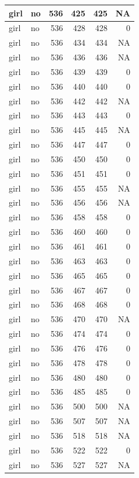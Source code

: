 \documentclass[man]{apa6}
\begin{document}
\begin{tabular}{l|l|r|r|r|r}
\hline
girl & no & 536 & 425 & 425 & NA\\
\hline
girl & no & 536 & 428 & 428 & 0\\
\hline
girl & no & 536 & 434 & 434 & NA\\
\hline
girl & no & 536 & 436 & 436 & NA\\
\hline
girl & no & 536 & 439 & 439 & 0\\
\hline
girl & no & 536 & 440 & 440 & 0\\
\hline
girl & no & 536 & 442 & 442 & NA\\
\hline
girl & no & 536 & 443 & 443 & 0\\
\hline
girl & no & 536 & 445 & 445 & NA\\
\hline
girl & no & 536 & 447 & 447 & 0\\
\hline
girl & no & 536 & 450 & 450 & 0\\
\hline
girl & no & 536 & 451 & 451 & 0\\
\hline
girl & no & 536 & 455 & 455 & NA\\
\hline
girl & no & 536 & 456 & 456 & NA\\
\hline
girl & no & 536 & 458 & 458 & 0\\
\hline
girl & no & 536 & 460 & 460 & 0\\
\hline
girl & no & 536 & 461 & 461 & 0\\
\hline
girl & no & 536 & 463 & 463 & 0\\
\hline
girl & no & 536 & 465 & 465 & 0\\
\hline
girl & no & 536 & 467 & 467 & 0\\
\hline
girl & no & 536 & 468 & 468 & 0\\
\hline
girl & no & 536 & 470 & 470 & NA\\
\hline
girl & no & 536 & 474 & 474 & 0\\
\hline
girl & no & 536 & 476 & 476 & 0\\
\hline
girl & no & 536 & 478 & 478 & 0\\
\hline
girl & no & 536 & 480 & 480 & 0\\
\hline
girl & no & 536 & 485 & 485 & 0\\
\hline
girl & no & 536 & 500 & 500 & NA\\
\hline
girl & no & 536 & 507 & 507 & NA\\
\hline
girl & no & 536 & 518 & 518 & NA\\
\hline
girl & no & 536 & 522 & 522 & 0\\
\hline
girl & no & 536 & 527 & 527 & NA\\

\end{tabular}
\end{document}
